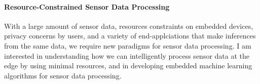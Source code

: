 \documentclass[10pt]{article}
\begin{document}




\paragraph{Resource-Constrained Sensor Data Processing}
With a large amount of sensor data, resources constraints on embedded devices, privacy concerns by users, and a variety of end-applciations that make inferences from the same data, we require new paradigms for %
sensor data processing. %
I am interested in understanding how we can intelligently process sensor data at the edge by using minimal resources, and in developing embedded machine learning algorithms for sensor data processing. 
\end{document}
